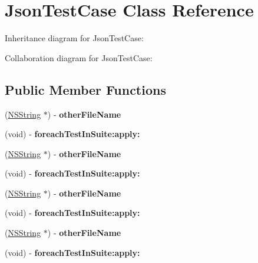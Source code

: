 \hypertarget{interface_json_test_case}{
\section{\-Json\-Test\-Case \-Class \-Reference}
\label{interface_json_test_case}
}


\-Inheritance diagram for \-Json\-Test\-Case\-:


\-Collaboration diagram for \-Json\-Test\-Case\-:
\subsection*{\-Public \-Member \-Functions}
\begin{DoxyCompactItemize}
\item 
\hypertarget{interface_json_test_case_a306475a94222dccbda9cc2bc7869b4da}{
(\hyperlink{class_n_s_string}{\-N\-S\-String} $\ast$) -\/ {\bfseries other\-File\-Name}}
\label{interface_json_test_case_a306475a94222dccbda9cc2bc7869b4da}

\item 
\hypertarget{interface_json_test_case_aed150386fc3da7e855f3943c81c3fd73}{
(void) -\/ {\bfseries foreach\-Test\-In\-Suite\-:apply\-:}}
\label{interface_json_test_case_aed150386fc3da7e855f3943c81c3fd73}

\item 
\hypertarget{interface_json_test_case_ad2c52e6c8a80007958637394d698ccb6}{
(\hyperlink{class_n_s_string}{\-N\-S\-String} $\ast$) -\/ {\bfseries other\-File\-Name}}
\label{interface_json_test_case_ad2c52e6c8a80007958637394d698ccb6}

\item 
\hypertarget{interface_json_test_case_aed150386fc3da7e855f3943c81c3fd73}{
(void) -\/ {\bfseries foreach\-Test\-In\-Suite\-:apply\-:}}
\label{interface_json_test_case_aed150386fc3da7e855f3943c81c3fd73}

\item 
\hypertarget{interface_json_test_case_ad2c52e6c8a80007958637394d698ccb6}{
(\hyperlink{class_n_s_string}{\-N\-S\-String} $\ast$) -\/ {\bfseries other\-File\-Name}}
\label{interface_json_test_case_ad2c52e6c8a80007958637394d698ccb6}

\item 
\hypertarget{interface_json_test_case_aed150386fc3da7e855f3943c81c3fd73}{
(void) -\/ {\bfseries foreach\-Test\-In\-Suite\-:apply\-:}}
\label{interface_json_test_case_aed150386fc3da7e855f3943c81c3fd73}

\item 
\hypertarget{interface_json_test_case_ad2c52e6c8a80007958637394d698ccb6}{
(\hyperlink{class_n_s_string}{\-N\-S\-String} $\ast$) -\/ {\bfseries other\-File\-Name}}
\label{interface_json_test_case_ad2c52e6c8a80007958637394d698ccb6}

\item 
\hypertarget{interface_json_test_case_aed150386fc3da7e855f3943c81c3fd73}{
(void) -\/ {\bfseries foreach\-Test\-In\-Suite\-:apply\-:}}
\label{interface_json_test_case_aed150386fc3da7e855f3943c81c3fd73}

\end{DoxyCompactItemize}
